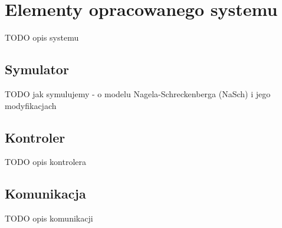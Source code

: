 \chapter{Elementy opracowanego systemu}
TODO opis systemu

\section{Symulator}
\label{chap:symulacja}
TODO jak symulujemy - o modelu Nagela-Schreckenberga (NaSch) i jego modyfikacjach

\section{Kontroler}
TODO opis kontrolera

\section{Komunikacja}
TODO opis komunikacji